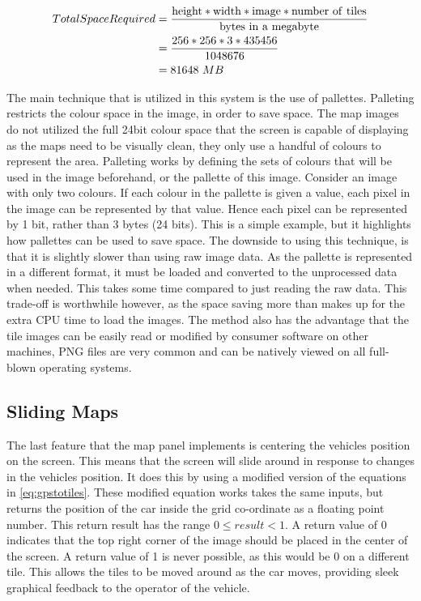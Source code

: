 \begin{align}
\label{eq:mapstorage}
Total Space Required &=\frac {\mathrm{height} * \mathrm{width} *\mathrm{image}* {\mathrm{number\ of\ tiles}}} {{ \mathrm{bytes\ in\ a\ megabyte}}} \\
&= \frac{256*256*3*435456}{1048676} \notag \\
&= 81648~MB \notag
\end{align}

The main technique that is utilized in this system is the use of pallettes. Palleting restricts the colour space in the image, in order to save space. The map images do not utilized the full 24bit colour space that the screen is capable of displaying as the maps need to be visually clean, they only use a handful of colours to represent the area. Palleting works by defining the sets of colours that will be used in the image beforehand, or the pallette of this image. Consider an image with only two colours. If each colour in the pallette is given a value, each pixel in the image can be represented by that value. Hence each pixel can be represented by 1 bit, rather than 3 bytes (24 bits). This is a simple example, but it highlights how pallettes can be used to save space.
The downside to using this technique, is that it is slightly slower than using raw image data. As the pallette is represented in a different format, it must be loaded and converted to the unprocessed data when needed. This takes some time compared to just reading the raw data. This trade-off is worthwhile however, as the space saving more than makes up for the extra CPU time to load the images. The method also has the advantage that the tile images can be easily read or modified by consumer software on other machines, PNG files are very common and can be natively viewed on all full-blown operating systems.


\subsection{Sliding Maps}

The last feature that the map panel implements is centering the vehicles position on the screen. This means that the screen will slide around in response to changes in the vehicles position. It does this by using a modified version of the equations in \ref{eq:gpstotiles}. These modified equation works takes the same inputs, but returns the position of the car inside the grid co-ordinate as a floating point number. This return result has the range $0 \le result<1$. A return value of 0 indicates that the top right corner of the image should be placed in the center of the screen. A return value of 1 is never possible, as this would be 0 on a different tile. This allows the tiles to be moved around as the car moves, providing sleek graphical feedback to the operator of the vehicle.



